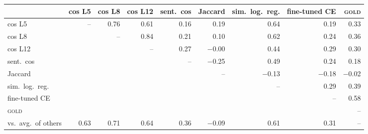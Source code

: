 \begin{tabular}{lrrrrrrrr}
\toprule
 & cos L5 & cos L8 & cos L12 & sent.\ cos & Jaccard & sim.\ log.\ reg. & fine-tuned CE & \textsc{gold} \\
\midrule
cos L5 & -- & \phantom{$-$}0.76 & \phantom{$-$}0.61 & \phantom{$-$}0.16 & \phantom{$-$}0.19 & \phantom{$-$}0.64 & \phantom{$-$}0.19 & \phantom{$-$}0.33 \\
cos L8 &  & -- & \phantom{$-$}0.84 & \phantom{$-$}0.21 & \phantom{$-$}0.10 & \phantom{$-$}0.62 & \phantom{$-$}0.24 & \phantom{$-$}0.36 \\
cos L12 &  &  & -- & \phantom{$-$}0.27 & $-$0.00 & \phantom{$-$}0.44 & \phantom{$-$}0.29 & \phantom{$-$}0.30 \\
sent.\ cos &  &  &  & -- & $-$0.25 & \phantom{$-$}0.49 & \phantom{$-$}0.24 & \phantom{$-$}0.18 \\
Jaccard &  &  &  &  & -- & $-$0.13 & $-$0.18 & $-$0.02 \\
sim.\ log.\ reg. &  &  &  &  &  & -- & \phantom{$-$}0.29 & \phantom{$-$}0.39 \\
fine-tuned CE &  &  &  &  &  &  & -- & \phantom{$-$}0.58 \\
\textsc{gold} &  &  &  &  &  &  &  & -- \\
\midrule
vs.\ avg.\ of others & \phantom{$-$}0.63 & \phantom{$-$}0.71 & \phantom{$-$}0.64 & \phantom{$-$}0.36 & $-$0.09 & \phantom{$-$}0.61 & \phantom{$-$}0.31 & -- \\
\bottomrule
\end{tabular}